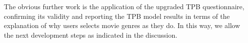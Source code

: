 \documentclass{llncs}
\begin{document}
The obvious further work is the application of the upgraded TPB questionnaire, confirming its validity and reporting the TPB model results in terms of the explanation of why users selects movie genres as they do. In this way, we allow the next development steps as indicated in the discussion.



% 
% 
% 







\end{document}
